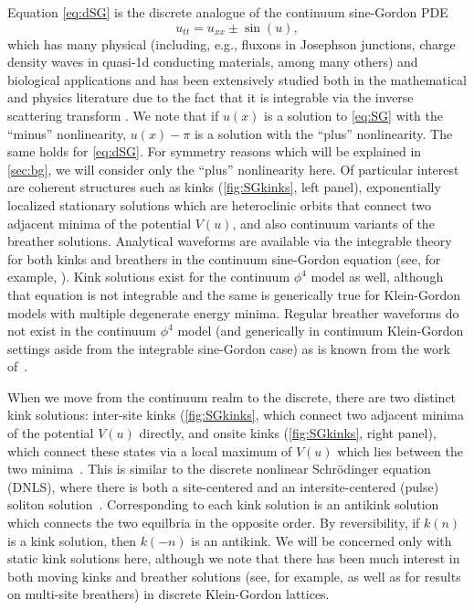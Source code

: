 \documentclass[12pt,reqno]{amsart}
\begin{document}
Equation \cref{eq:dSG} is the discrete analogue of the 
continuum sine-Gordon PDE
\begin{equation}\label{eq:SG}
	u_{tt} = u_{xx} \pm \sin(u),
\end{equation}
which has many physical (including, e.g.,
fluxons in Josephson junctions, charge density
waves in quasi-1d conducting materials, among many others)
and biological applications \cites{SGbook,Ivancevic2013} and has been extensively studied both in the mathematical and physics literature due to the fact that it is integrable via the inverse scattering transform \cite{SolitonBook1}. 
We note that if $u(x)$ is a solution to \cref{eq:SG} with the ``minus'' nonlinearity, $u(x) - \pi$ is a solution with the ``plus'' nonlinearity. The same holds for \cref{eq:dSG}. For symmetry reasons which will be explained in \cref{sec:bg}, we will consider only the {``plus''} nonlinearity here.
Of particular interest are coherent structures such as kinks (\cref{fig:SGkinks}, left panel), exponentially localized stationary solutions which 
are heteroclinic orbits that connect two adjacent minima of the potential $V(u)$, and also continuum variants of the breather
solutions. Analytical waveforms are available via the 
integrable theory for both kinks and breathers in the continuum sine-Gordon equation (see, for example, \cite{SGchapter}). Kink  solutions exist for the continuum $\phi^4$ model as well, although that equation is not integrable \cites{SGbook,KevrekidisWeinstein2000}
and the same is generically true for Klein-Gordon
models
with multiple degenerate energy minima.
Regular breather waveforms do not exist
in the continuum $\phi^4$ model (and generically in continuum
Klein-Gordon settings aside from the integrable
sine-Gordon case) as is known from the work of~\cite{segur}. 

When we move from the continuum realm to the discrete, there are two distinct kink solutions: inter-site kinks (\cref{fig:SGkinks}, which connect two adjacent minima of the potential $V(u)$ directly, and onsite kinks (\cref{fig:SGkinks}, right panel), which connect these states via a local maximum of $V(u)$ which lies between the two minima~\cite{peyrard}. 
This is similar to the discrete nonlinear Schr{\"o}dinger equation (DNLS), where there is both a site-centered and an intersite-centered (pulse) soliton solution~\cite{Kevrekidis2009}. Corresponding to each kink solution is an antikink solution which connects the two equilbria in the opposite order. By reversibility, if $k(n)$ is a kink solution, then $k(-n)$ is an antikink. We will be concerned only with static kink solutions here, although we note that there has been much interest in both moving kinks \cites{Aigner2003,Iooss2006,Cisneros2008} and breather solutions (see, for example, \cites{SGbook} as well as \cites{Pelinovsky2012,Cuevas2011} for results on multi-site breathers) in discrete Klein-Gordon lattices.
\end{document}
